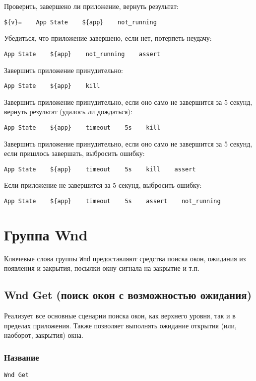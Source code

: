 \documentclass[11pt]{book} %
\begin{document}
Проверить, завершено ли приложение, вернуть результат:
\begin{verbatim}${v}=    App State    ${app}    not_running\end{verbatim}

Убедиться, что приложение завершено, если нет, потерпеть неудачу:
\begin{verbatim}App State    ${app}    not_running    assert\end{verbatim}

Завершить приложение принудительно:
\begin{verbatim}App State    ${app}    kill\end{verbatim}

Завершить приложение принудительно, если оно само не завершится за 5 секунд, вернуть результат (удалось ли дождаться):
\begin{verbatim}App State    ${app}    timeout    5s    kill\end{verbatim}

Завершить приложение принудительно, если оно само не завершится за 5 секунд, если пришлось завершать, выбросить ошибку:
\begin{verbatim}App State    ${app}    timeout    5s    kill    assert\end{verbatim}

Если приложение не завершится за 5 секунд, выбросить ошибку:
\begin{verbatim}App State    ${app}    timeout    5s    assert    not_running\end{verbatim}


\section{Группа Wnd}
Ключевые слова группы \verb"Wnd" предоставляют средства поиска окон, ожидания из появления и закрытия, посылки окну сигнала на закрытие и т.п.


\subsection{Wnd Get (поиск окон с возможностью ожидания)}
Реализует все основные сценарии поиска окон, как верхнего уровня, так и в пределах приложения. Также позволяет выполнять ожидание открытия (или, наоборот, закрытия) окна.

\subsubsection*{Название}
\verb"Wnd Get"
\end{document}
